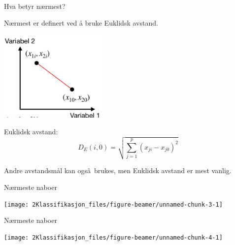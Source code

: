 \documentclass[10pt,ignorenonframetext,]{beamer}
\begin{document}
\begin{frame}

\begin{block}{Hva betyr nærmest?}

\vspace{2mm}

Nærmest er definert ved å bruke Euklidsk avstand.

\centering

\includegraphics[width=0.4\textwidth,height=\textheight]{avstand.png}

\flushleft

Euklidsk avstand: \[D_E(i,0)=\sqrt{\sum_{j=1}^p (x_{ji}-x_{j0})^2 }\]

Andre avstandsm\aa l kan ogs\aa  ~brukes, men Euklidsk avstand er mest
vanlig.

\end{block}

\end{frame}

\begin{frame}

\begin{block}{N\ae rmeste naboer}

\vspace{5mm}

\begin{center}\texttt{[image: 2Klassifikasjon\_files/figure-beamer/unnamed-chunk-3-1]} \end{center}

\end{block}

\end{frame}

\begin{frame}

\begin{block}{N\ae rmeste naboer}

\vspace{5mm}

\begin{center}\texttt{[image: 2Klassifikasjon\_files/figure-beamer/unnamed-chunk-4-1]} \end{center}

\end{block}

\end{frame}
\end{document}
